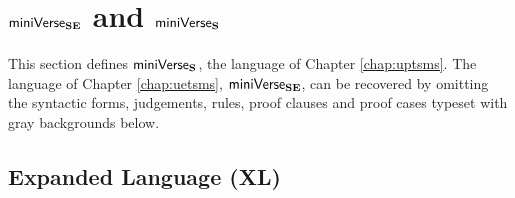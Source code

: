 \chapter{\texorpdfstring{$\mathsf{miniVerse}_\textbf{SE}$ and $\mathsf{miniVerse}_\textbf{S}$}{miniVerseSE and miniVerseS}}\label{appendix:miniVerseSES}

This section defines $\mathsf{miniVerse}_\textbf{S}$, the language of Chapter \ref{chap:uptsms}. The language of Chapter \ref{chap:uetsms}, $\mathsf{miniVerse}_\textbf{SE}$, can be recovered by omitting the syntactic forms, judgements, rules, proof clauses and proof cases typeset with gray backgrounds below.

\clearpage

\section{Expanded Language (XL)}\label{appendix:SES-XL}
